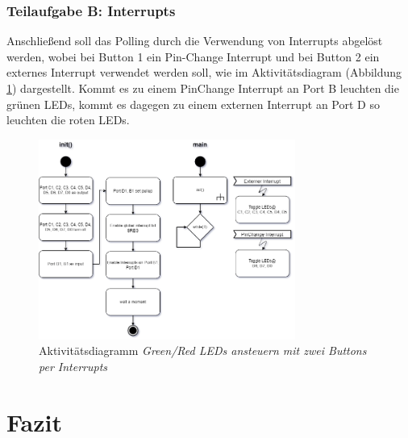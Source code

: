 \documentclass{article}
\begin{document}
\subsubsection{Teilaufgabe B: Interrupts}

\noindent Anschließend soll das Polling durch die Verwendung von Interrupts abgelöst werden, wobei bei Button 1 ein Pin-Change Interrupt und bei Button 2 ein externes Interrupt verwendet werden soll, wie im Aktivitätsdiagram (Abbildung \ref{fig:ad-a3b}) dargestellt.
Kommt es zu einem PinChange Interrupt an Port B leuchten die grünen LEDs, kommt es dagegen zu einem externen Interrupt an Port D so leuchten die roten LEDs.

\begin{figure}[ht]
    \centering
    \includegraphics[width=0.75\textwidth]{images/A3b-AD-Interrupt.png}
    \caption{Aktivitätsdiagramm \textit{Green/Red LEDs ansteuern mit zwei Buttons per Interrupts}}
    \label{fig:ad-a3b}
\end{figure}

\clearpage

\section{Fazit}
\end{document}
